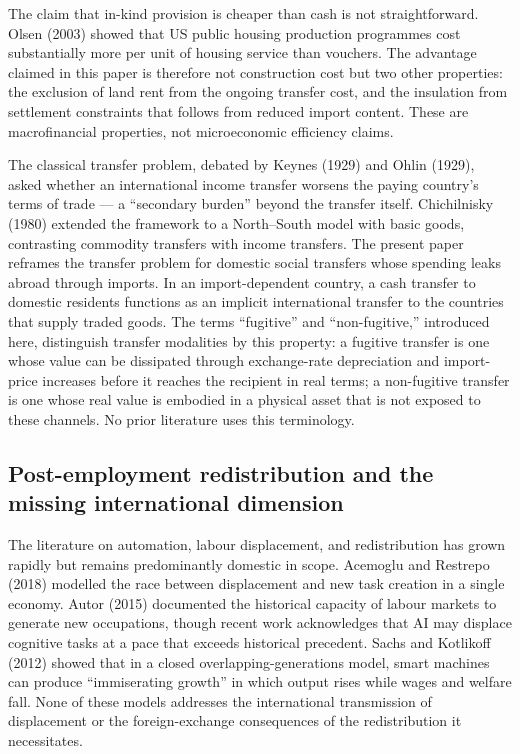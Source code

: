 \documentclass[preprint,review,12pt]{elsarticle}
\begin{document}
The claim that in-kind provision is cheaper than cash is not
straightforward. Olsen (2003) showed that US public housing production
programmes cost substantially more per unit of housing service than
vouchers. The advantage claimed in this paper is therefore not
construction cost but two other properties: the exclusion of land rent
from the ongoing transfer cost, and the insulation from settlement
constraints that follows from reduced import content. These are
macrofinancial properties, not microeconomic efficiency claims.

The classical transfer problem, debated by Keynes (1929) and Ohlin
(1929), asked whether an international income transfer worsens the
paying country's terms of trade --- a ``secondary burden'' beyond the
transfer itself. Chichilnisky (1980) extended the framework to a
North--South model with basic goods, contrasting commodity transfers
with income transfers. The present paper reframes the transfer problem
for domestic social transfers whose spending leaks abroad through
imports. In an import-dependent country, a cash transfer to domestic
residents functions as an implicit international transfer to the
countries that supply traded goods. The terms ``fugitive'' and
``non-fugitive,'' introduced here, distinguish transfer modalities by
this property: a fugitive transfer is one whose value can be dissipated
through exchange-rate depreciation and import-price increases before it
reaches the recipient in real terms; a non-fugitive transfer is one
whose real value is embodied in a physical asset that is not exposed to
these channels. No prior literature uses this terminology.

\subsection{Post-employment redistribution and the missing international dimension}

The literature on automation, labour displacement, and redistribution
has grown rapidly but remains predominantly domestic in scope. Acemoglu
and Restrepo (2018) modelled the race between displacement and new task
creation in a single economy. Autor (2015) documented the historical
capacity of labour markets to generate new occupations, though recent
work acknowledges that AI may displace cognitive tasks at a pace that
exceeds historical precedent. Sachs and Kotlikoff (2012) showed that in
a closed overlapping-generations model, smart machines can produce
``immiserating growth'' in which output rises while wages and welfare
fall. None of these models addresses the international transmission of
displacement or the foreign-exchange consequences of the redistribution
it necessitates.
\end{document}
